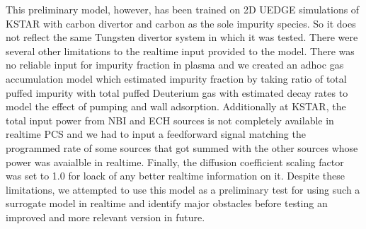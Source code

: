This preliminary model, however, has been trained on 2D UEDGE simulations of KSTAR with carbon divertor and carbon as the sole impurity species.
So it does not reflect the same Tungsten divertor system in which it was tested.
There were several other limitations to the realtime input provided to the model.
There was no reliable input for impurity fraction in plasma and we created an adhoc gas accumulation model which estimated impurity fraction by taking ratio of total puffed impurity with total puffed Deuterium gas with estimated decay rates to model the effect of pumping and wall adsorption.
Additionally at KSTAR, the total input power from NBI and ECH sources is not completely available in realtime PCS and we had to input a feedforward signal matching the programmed rate of some sources that got summed with the other sources whose power was avaialble in realtime.
Finally, the diffusion coefficient scaling factor was set to 1.0 for loack of any better realtime information on it.
Despite these limitations, we attempted to use this model as a preliminary test for using such a surrogate model in realtime and identify major obstacles before testing an improved and more relevant version in future.
